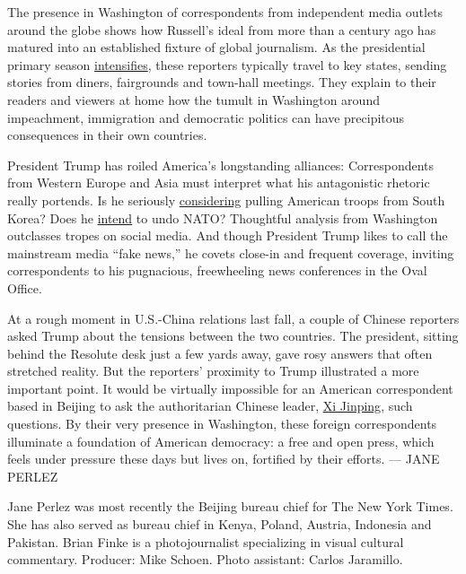 The presence in Washington of correspondents from independent media
outlets around the globe shows how Russell's ideal from more than a
century ago has matured into an established fixture of global
journalism. As the presidential primary season
\href{https://www.nytimes.com/interactive/2019/us/elections/2020-presidential-election-calendar.html}{intensifies},
these reporters typically travel to key states, sending stories from
diners, fairgrounds and town-hall meetings. They explain to their
readers and viewers at home how the tumult in Washington around
impeachment, immigration and democratic politics can have precipitous
consequences in their own countries.

President Trump has roiled America's longstanding alliances:
Correspondents from Western Europe and Asia must interpret what his
antagonistic rhetoric really portends. Is he seriously
\href{https://www.nytimes.com/2018/05/03/world/asia/trump-troops-south-korea.html}{considering}
pulling American troops from South Korea? Does he
\href{https://www.nytimes.com/2019/01/14/us/politics/nato-president-trump.html}{intend}
to undo NATO? Thoughtful analysis from Washington outclasses tropes on
social media. And though President Trump likes to call the mainstream
media ``fake news,'' he covets close-in and frequent coverage, inviting
correspondents to his pugnacious, freewheeling news conferences in the
Oval Office.

At a rough moment in U.S.-China relations last fall, a couple of Chinese
reporters asked Trump about the tensions between the two countries. The
president, sitting behind the Resolute desk just a few yards away, gave
rosy answers that often stretched reality. But the reporters' proximity
to Trump illustrated a more important point. It would be virtually
impossible for an American correspondent based in Beijing to ask the
authoritarian Chinese leader,
\href{https://www.nytimes.com/topic/person/xi-jinping}{Xi Jinping}, such
questions. By their very presence in Washington, these foreign
correspondents illuminate a foundation of American democracy: a free and
open press, which feels under pressure these days but lives on,
fortified by their efforts. --- JANE PERLEZ

Jane Perlez was most recently the Beijing bureau chief for The New York
Times. She has also served as bureau chief in Kenya, Poland, Austria,
Indonesia and Pakistan. Brian Finke is a photojournalist specializing in
visual cultural commentary. Producer: Mike Schoen. Photo assistant:
Carlos Jaramillo.

